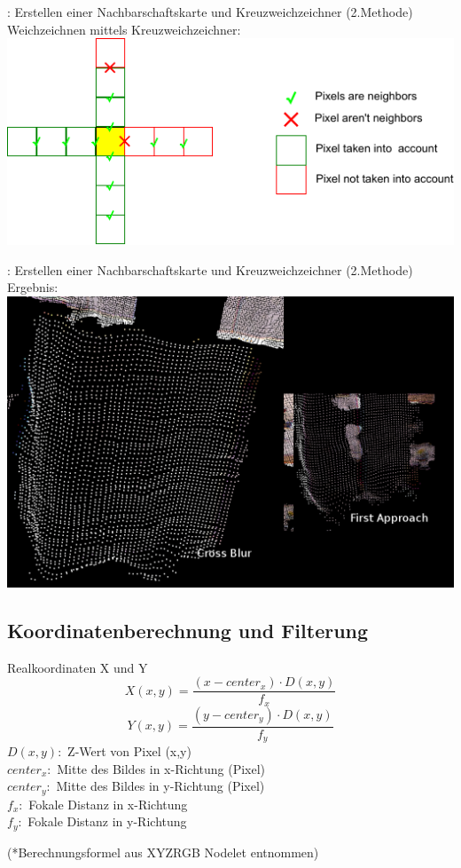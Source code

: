 \documentclass{VLKlauck}
\begin{document}
	\begin{frame}{\insertsubsection: Erstellen einer Nachbarschaftskarte und Kreuzweichzeichner (2.Methode)}
	 	Weichzeichnen mittels Kreuzweichzeichner:\\[0.5cm]
	 	\includegraphics[width=\textwidth]{crossBlur.pdf}
	\end{frame}
	   
	   
	\begin{frame}{\insertsubsection: Erstellen einer Nachbarschaftskarte und Kreuzweichzeichner (2.Methode)}
	   Ergebnis:
	   \includegraphics[width=\textwidth]{crossBlurResult.png}
	\end{frame}
	   
	\subsection{Koordinatenberechnung und Filterung}
	\begin{frame}{Realkoordinaten X und Y}
	$$X(x,y)=\frac{(x-center_x) \cdot D(x,y)}{f_x}$$
	$$Y(x,y)=\frac{(y-center_y) \cdot D(x,y)}{f_y}$$
	$D(x,y):$ Z-Wert von Pixel (x,y)\\
	$center_x :$ Mitte des Bildes in x-Richtung (Pixel)\\
	$center_y :$ Mitte des Bildes in y-Richtung (Pixel)\\	
	$f_x:$ Fokale Distanz in x-Richtung\\
	$f_y:$ Fokale Distanz in y-Richtung
	
	(*Berechnungsformel aus XYZRGB Nodelet entnommen)
	
	\end{frame}
	   
\end{document}
